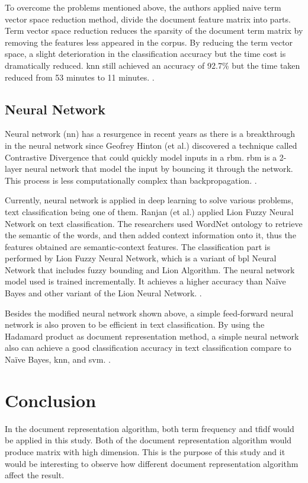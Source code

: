To overcome the problems mentioned above, the authors applied naive term vector space reduction method, divide the document feature matrix into parts. Term vector space reduction reduces 
the sparsity of the document term matrix by removing the features less appeared in the corpus. By reducing the term vector space, a slight deterioration in the classification accuracy but the time cost is dramatically reduced. \ac{knn} still achieved an accuracy of 92.7\% but the time taken reduced from 53 minutes to 11 minutes. \cite{knnVectorSpaceReduction}.\\


\subsection{Neural Network}
Neural network (\ac{nn}) has a resurgence in recent years as there is a breakthrough in the neural network since Geofrey Hinton (et al.) discovered a technique called Contrastive Divergence that could quickly model inputs in a \ac{rbm}. \Ac{rbm} is a 2-layer neural network that model the input by bouncing it through the network. This process is less computationally complex than backpropagation. \cite{nnHinton}.
	
Currently, neural network is applied in deep learning to solve various problems, text classification being one of them. Ranjan (et al.) applied Lion Fuzzy Neural Network on text classification. The researchers used WordNet ontology to retrieve the semantic of the words, and then added context information onto it, thus the features obtained are semantic-context features. The classification part is performed by Lion Fuzzy Neural Network, which is a variant of \ac{bpl} Neural Network that includes fuzzy bounding and Lion Algorithm. The neural network model used is trained incrementally. It achieves a higher accuracy than Naïve Bayes and other variant of the Lion Neural Network. \cite{lionNn}.
	
Besides the modified neural network shown above, a simple feed-forward neural network is also proven to be efficient in text classification. By using the Hadamard product as document representation method, a simple neural network also can achieve a good classification accuracy in text classification compare to Naïve Bayes, \ac{knn}, and \ac{svm}. \cite{oneNn}.\\
	

\section{Conclusion}
In the document representation algorithm, both term frequency and \ac{tfidf} would be applied in this study. Both of the document representation algorithm would produce matrix with high dimension. This is the purpose of this study and it would be interesting to observe how different document representation algorithm affect the result.

